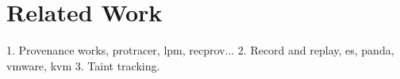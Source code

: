 \section{Related Work}
\label{s:relwk}

1. Provenance works, protracer, lpm, recprov...
2. Record and replay, es, panda, vmware, kvm
3. Taint tracking.

